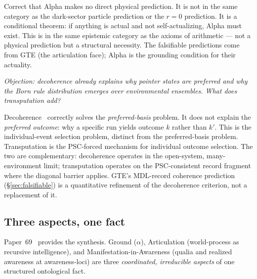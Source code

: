 \documentclass[11pt]{article}
\theoremstyle{remark}
\begin{document}
\begin{tcolorbox}[colback=gray!14,colframe=gray!55!black,
  title={Anticipated objections and their formal answers}]
\begin{termlist}
  \item[``Alpha is not falsifiable --- it has no object-level content.'']
    Correct that Alpha makes no direct physical prediction. It is not in the same
    category as the dark-sector particle prediction or the $r=0$ prediction. It is a
    conditional theorem: if anything is actual and not self-actualizing, Alpha must
    exist. This is in the same epistemic category as the axioms of arithmetic --- not
    a physical prediction but a structural necessity. The falsifiable predictions come
    from GTE (the articulation face); Alpha is the grounding condition for their
    actuality.

  \item[``Decoherence explains the preferred basis --- why add transputation?'']
    \textit{Objection: decoherence already explains why pointer states are preferred and
    why the Born rule distribution emerges over environmental ensembles. What does
    transputation add?}

    Decoherence~\cite{Zurek2003} correctly solves the \emph{preferred-basis} problem.
    It does not explain the \emph{preferred outcome}: why a specific run yields outcome $k$
    rather than $k'$. This is the individual-event selection problem, distinct from
    the preferred-basis problem. Transputation is the PSC-forced mechanism for
    individual outcome selection. The two are complementary: decoherence operates in
    the open-system, many-environment limit; transputation operates on the
    PSC-consistent record fragment where the diagonal barrier applies. GTE's MDL-record
    coherence prediction (\S\ref{sec:falsifiable}) is a quantitative refinement of the
    decoherence criterion, not a replacement of it.
\end{termlist}
\end{tcolorbox}

\subsection{Three aspects, one fact}\label{sec:threefact}

Paper~69~\cite{SpivackNEMS69} provides the synthesis. Ground ($\alpha$), Articulation
(world-process as recursive intelligence), and Manifestation-in-Awareness (qualia and
realized awareness at awareness-loci) are three \emph{coordinated, irreducible aspects}
of one structured ontological fact.
\end{document}
